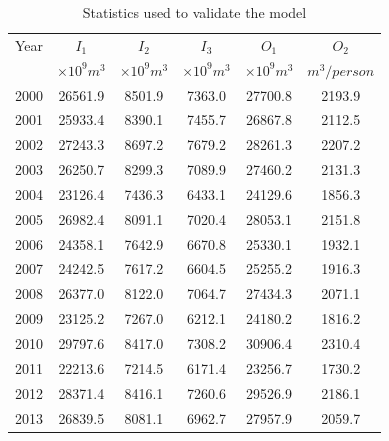\begin{table}[!htbp]
\centering\caption{Statistics used to validate the model}
\begin{tabular}{c|ccc|cc}
  \hline
  Year & $I_1$ & $I_2$ & $I_3$ & $O_1$ & $O_2$ \\
   & $\times10^9 m^3$ & $\times10^9 m^3$ & $\times10^9 m^3$ & $\times10^9 m^3$ & $m^3/person$ \\
   \hline
    2000   &   26561.9   &   8501.9   &   7363.0   &   27700.8   &   2193.9   \\
    2001   &   25933.4   &   8390.1   &   7455.7   &   26867.8   &   2112.5   \\
    2002   &   27243.3   &   8697.2   &   7679.2   &   28261.3   &   2207.2   \\
    2003   &   26250.7   &   8299.3   &   7089.9   &   27460.2   &   2131.3   \\
  2004 & 23126.4 & 7436.3 & 6433.1 & 24129.6 & 1856.3 \\
  2005 & 26982.4 & 8091.1 & 7020.4 & 28053.1 & 2151.8 \\
  2006 & 24358.1 & 7642.9 & 6670.8 & 25330.1 & 1932.1 \\
  2007 & 24242.5 & 7617.2 & 6604.5 & 25255.2 & 1916.3 \\
  2008 & 26377.0 & 8122.0 & 7064.7 & 27434.3 & 2071.1 \\
  2009 & 23125.2 & 7267.0 & 6212.1 & 24180.2 & 1816.2 \\
  2010 & 29797.6 & 8417.0 & 7308.2 & 30906.4 & 2310.4 \\
  2011 & 22213.6 & 7214.5 & 6171.4 & 23256.7 & 1730.2 \\
  \hline
  2012 & 28371.4 & 8416.1 & 7260.6 & 29526.9 & 2186.1 \\
  2013 & 26839.5 & 8081.1 & 6962.7 & 27957.9 & 2059.7 \\
  \hline
\end{tabular}
\label{testdata}
\end{table}

